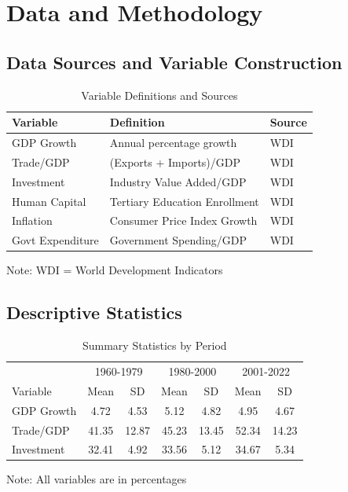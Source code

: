 \documentclass[12pt,a4paper]{article}
\theoremstyle{definition}
\begin{document}
\section{Data and Methodology}
\subsection{Data Sources and Variable Construction}
\begin{table}[H]
\centering
\caption{Variable Definitions and Sources}
\begin{threeparttable}
\begin{tabular}{lll}
\toprule
Variable & Definition & Source \\
\midrule
GDP Growth & Annual percentage growth & WDI \\
Trade/GDP & (Exports + Imports)/GDP & WDI \\
Investment & Industry Value Added/GDP & WDI \\
Human Capital & Tertiary Education Enrollment & WDI \\
Inflation & Consumer Price Index Growth & WDI \\
Govt Expenditure & Government Spending/GDP & WDI \\
\bottomrule
\end{tabular}
\begin{tablenotes}
\small
\item Note: WDI = World Development Indicators
\end{tablenotes}
\end{threeparttable}
\end{table}

\subsection{Descriptive Statistics}
\begin{table}[H]
\centering
\caption{Summary Statistics by Period}
\begin{threeparttable}
\begin{tabular}{lcccccc}
\toprule
& \multicolumn{2}{c}{1960-1979} & \multicolumn{2}{c}{1980-2000} & \multicolumn{2}{c}{2001-2022} \\
\cmidrule(lr){2-3} \cmidrule(lr){4-5} \cmidrule(lr){6-7}
Variable & Mean & SD & Mean & SD & Mean & SD \\
\midrule
GDP Growth & 4.72 & 4.53 & 5.12 & 4.82 & 4.95 & 4.67 \\
Trade/GDP & 41.35 & 12.87 & 45.23 & 13.45 & 52.34 & 14.23 \\
Investment & 32.41 & 4.92 & 33.56 & 5.12 & 34.67 & 5.34 \\
\bottomrule
\end{tabular}
\begin{tablenotes}
\small
\item Note: All variables are in percentages
\end{tablenotes}
\end{threeparttable}
\end{table}
\end{document}

